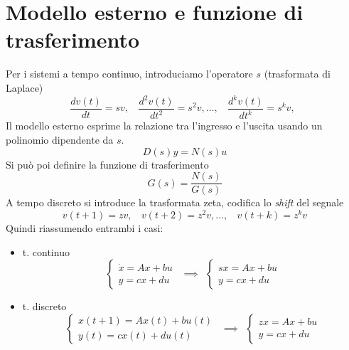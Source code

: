 \section{Modello esterno e funzione di trasferimento}

Per i sistemi a tempo continuo, introduciamo l'operatore $s$ (trasformata di Laplace)
\begin{equation*}
	\frac{dv(t)}{dt} =sv,\ \ \ \ \frac{d^2 v(t)}{dt^2} =s^2 v,\dotsc ,\ \ \ \ \frac{d^k v(t)}{dt^k} =s^k v,\ \ 
\end{equation*}
Il modello esterno esprime la relazione tra l'ingresso e l'uscita usando un polinomio dipendente da $s$.
\begin{equation*}
	D(s) y=N(s) u
\end{equation*}
Si può poi definire la funzione di trasferimento
\begin{equation*}
	\boxed{G(s) =\frac{N(s)}{G(s)}}
\end{equation*}
A tempo discreto si introduce la trasformata zeta, codifica lo \textit{shift} del segnale
\begin{equation*}
	v(t+1) =zv,\ \ \ \ v(t+2) =z^2 v,\dotsc ,\ \ \ \ v(t+k) =z^k v
\end{equation*}
Quindi riassumendo entrambi i casi:
\begin{itemize}
	\item t. continuo\begin{equation*}
	      \begin{cases}
	      	\dot{x} =Ax+bu \\
	      	y=cx+du        
	      \end{cases} \ \ \implies \ \ \begin{cases}
	      sx=Ax+bu\\
	      y=cx+du
	\end{cases}
	\end{equation*}
	\item t. discreto\begin{equation*}
	      \begin{cases}
	      	x(t+1)=Ax(t)+bu(t) \\
	      	y(t)=cx(t)+du(t)   
	      \end{cases} \ \ \implies \ \ \begin{cases}
	      zx=Ax+bu\\
	      y=cx+du
	\end{cases}
	\end{equation*}
\end{itemize}

